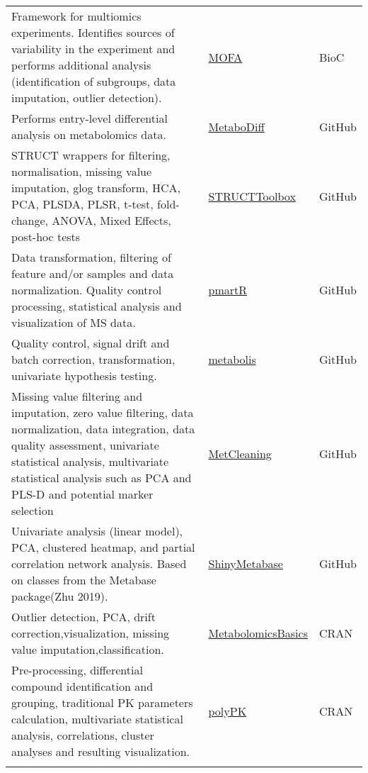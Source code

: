 \documentclass[]{article}
\begin{document}
\begin{longtable}{>{\raggedright\arraybackslash}p{30em}>{\raggedright\arraybackslash}p{10em}>{\raggedright\arraybackslash}p{3em}}
\rowcolor{gray!6}  Framework for multiomics experiments. Identifies sources of variability in the experiment and performs additional analysis (identification of subgroups, data imputation, outlier detection). & \href{https://www.bioconductor.org/packages/release/bioc/html/MOFA.html}{MOFA} & BioC\\
Performs entry-level differential analysis on metabolomics data. & \href{https://github.com/andreasmock/MetaboDiff}{MetaboDiff} & GitHub\\
\rowcolor{gray!6}  STRUCT wrappers for filtering, normalisation, missing value imputation, glog transform, HCA, PCA, PLSDA, PLSR, t-test, fold-change, ANOVA, Mixed Effects, post-hoc tests & \href{https://github.com/computational-metabolomics/structToolbox}{STRUCTToolbox} & GitHub\\
Data transformation, filtering of feature and/or samples and data normalization. Quality control processing, statistical analysis and visualization of MS data. & \href{https://github.com/pmartR/pmartR}{pmartR} & GitHub\\
\rowcolor{gray!6}  Quality control, signal drift and batch correction, transformation, univariate hypothesis testing. & \href{https://github.com/fgiacomoni/metabolis}{metabolis} & GitHub\\
Missing value filtering and imputation, zero value filtering, data normalization, data integration, data quality assessment, univariate statistical analysis, multivariate statistical analysis such as PCA and PLS-D and potential marker selection & \href{https://github.com/MetabLAB/MetCleaning}{MetCleaning} & GitHub\\
\rowcolor{gray!6}  Univariate analysis (linear model), PCA, clustered heatmap, and partial correlation network analysis. Based on classes from the Metabase package(Zhu 2019). & \href{https://github.com/zhuchcn/ShinyMetabase}{ShinyMetabase} & GitHub\\
Outlier detection, PCA, drift correction,visualization, missing value imputation,classification. & \href{https://cran.r-project.org/package=MetabolomicsBasics}{MetabolomicsBasics} & CRAN\\
\rowcolor{gray!6}  Pre-processing, differential compound identification and grouping, traditional PK parameters calculation, multivariate statistical analysis, correlations, cluster analyses and resulting visualization. & \href{https://cran.r-project.org/package=polyPK}{polyPK} & CRAN\\*
\end{longtable}
\end{document}
